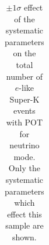 \begin{table}
\begin{tabular}{| l | r | r | r  r | r  r |}
\hline

\end{tabular}
\caption{
$\pm 1 \sigma$ effect of the systematic parameters on the total number of $e$-like Super-K events with
\TotalPotNu{} POT for neutrino 
mode.
   Only the systematic parameters which effect this sample are shown.
    \label{tab:syst_pm1sigma_elike_fhc}
}
\end{table}
